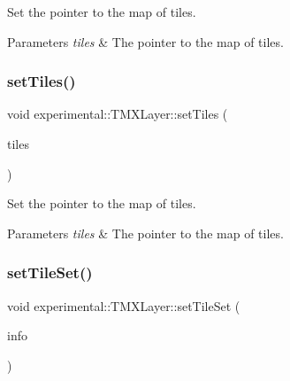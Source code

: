 Set the pointer to the map of tiles.


\begin{DoxyParams}{Parameters}
{\em tiles} & The pointer to the map of tiles. \\
\hline
\end{DoxyParams}
\mbox{\label{classexperimental_1_1TMXLayer_a8b38eb29a2a6cac31bdde2e78555dad0}} 
\subsubsection{\texorpdfstring{set\+Tiles()}{setTiles()}\hspace{0.1cm}{\footnotesize\ttfamily [2/2]}}
{\footnotesize\ttfamily void experimental\+::\+T\+M\+X\+Layer\+::set\+Tiles (\begin{DoxyParamCaption}\item[{uint32\+\_\+t $\ast$}]{tiles }\end{DoxyParamCaption})\hspace{0.3cm}{\ttfamily [inline]}}

Set the pointer to the map of tiles.


\begin{DoxyParams}{Parameters}
{\em tiles} & The pointer to the map of tiles. \\
\hline
\end{DoxyParams}
\mbox{\label{classexperimental_1_1TMXLayer_a864589e3f92c05635f7158922e884c98}} 
\subsubsection{\texorpdfstring{set\+Tile\+Set()}{setTileSet()}\hspace{0.1cm}{\footnotesize\ttfamily [1/2]}}
{\footnotesize\ttfamily void experimental\+::\+T\+M\+X\+Layer\+::set\+Tile\+Set (\begin{DoxyParamCaption}\item[{T\+M\+X\+Tileset\+Info $\ast$}]{info }\end{DoxyParamCaption})\hspace{0.3cm}{\ttfamily [inline]}}

